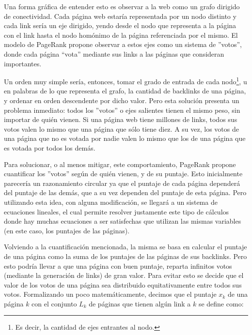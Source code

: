 \par Una forma gr\'afica de entender esto es observar a la web como un grafo
dirigido de conectividad. Cada p\'agina web estar\'ia representada por un nodo
distinto y cada link ser\'ia un eje dirigido, yendo desde el nodo que
representa a la p\'agina con el link hasta el nodo hom\'onimo de la p\'agina
referenciada por el mismo. El modelo de PageRank propone observar a estos ejes
como un sistema de ''votos'', donde cada p\'agina ``vota'' mediante sus links a las
p\'aginas que consideran importantes.

\par Un orden muy simple ser\'ia, entonces, tomar el grado de entrada de cada
nodo\footnote{Es decir, la cantidad de ejes entrantes al nodo.}, u en palabras
de lo que representa el grafo, la cantidad de backlinks de una p\'agina, y
ordenar en orden descendente por dicho valor. Pero esta soluci\'on presenta
un problema inmediato: todos los ''votos'' o ejes salientes tienen el mismo
peso, sin importar de qui\'en vienen. Si una p\'agina web tiene millones de
links, todos sus votos valen lo mismo que una p\'agina que s\'olo tiene diez. A
su vez, los votos de una p\'agina que no es votada por nadie valen lo mismo que
los de una p\'agina que es votada por todos los dem\'as.

\par Para solucionar, o al menos mitigar, este comportamiento, PageRank propone
cuantificar los ''votos'' seg\'un de quién vienen, y de su puntaje. Esto
inicialmente parecer\'ia un razonamiento circular ya que el puntaje de cada
p\'agina depender\'a del puntaje de las dem\'as, que a su vez dependen del
puntaje de esta p\'agina. Pero utilizando esta idea, con alguna modificaci\'on,
se llegar\'a a un sistema de ecuaciones lineales, el cual permite
resolver justamente este tipo de c\'alculos donde hay muchas ecuaciones a ser
satisfechas que utilizan las mismas variables (en este caso, los puntajes de las
p\'aginas).

\par Volviendo a la cuantificaci\'on mencionada, la misma se basa en calcular el
puntaje de una p\'agina como la suma de los puntajes de las p\'aginas de sus
backlinks. Pero esto podr\'ia llevar a que una p\'agina con buen puntaje,
reparta infinitos votos (mediante la generaci\'on de links) de gran valor. Para
evitar esto se decide que el valor de los votos de una p\'agina sea distribuido
equitativamente entre todos sus votos. Formalizando un poco matem\'aticamente,
decimos que el puntaje $x_k$ de una p\'agina $k$ con el conjunto $L_k$ de
p\'aginas que tienen alg\'un link a $k$ se define como:

